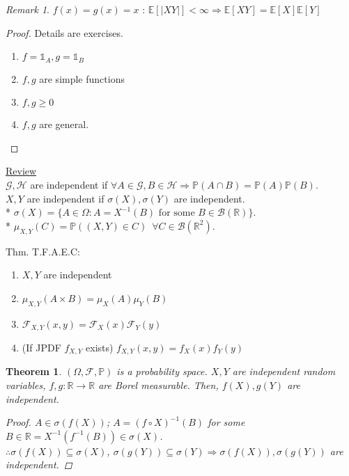 \documentclass[12pt]{report}
\newcommand{\R}{\mathbb{R}}
\renewcommand{\P}{\mathbb{P}}
\newcommand{\F}{\mathcal{F}}
\renewcommand{\1}{\mathbb{1}}
\renewcommand{\O}{\Omega}
\renewcommand{\r}{\rightarrow}
\renewcommand{\subset}{\subseteq}
\theoremstyle{break}
\newtheorem{thm}{Theorem}[section] %
\theoremstyle{newdef}
\theoremstyle{remark}
\newtheorem*{rem}{Remark} %
\begin{document}
\begin{rem}
$f(x) = g(x) = x$ : $\mathbb{E}[|XY|] < \infty \Rightarrow \mathbb{E}[XY] = \mathbb{E}[X]\mathbb{E}[Y]$
\end{rem}


\begin{proof}
Details are exercises.
\begin{enumerate}[label = (\arabic*)]
\item $f = \mathbb{1}_A, g = \mathbb{1}_B$
\item $f, g$ are simple functions
\item $f, g \geq 0$
\item $f, g$ are general.
\end{enumerate}
\end{proof}






\underline{Review}\\
$\mathcal{G, H}$ are independent if
$\forall A \in \mathcal{G}, B \in \mathcal{H} \Rightarrow \P(A \cap B) = \P(A)\P(B).$\\
$X, Y$ are independent if $\sigma(X), \sigma(Y)$ are independent.\\
* $\sigma(X) = \{A \in \Omega : A = X^{-1}(B) \text{ for some } B \in \mathcal{B}(\R)\}$.\\
* $\mu_{X,Y}(C) = \P((X,Y) \in C) \enspace \forall C \in \mathcal{B}(\R^2)$.

\vspace{5mm}

Thm. T.F.A.E.C:
\begin{enumerate}
\item $X,Y$ are independent
\item $\mu_{X,Y}(A\times B) = \mu_X(A)\mu_Y(B)$
\item $\F_{X,Y}(x,y) = \F_X(x)\F_Y(y)$
\item (If JPDF $f_{X,Y}$ exists) $f_{X,Y}(x,y) = f_X(x)f_Y(y)$
\end{enumerate}




\begin{thm}
$(\O,\F,\P)$ is a probability space. $X,Y$ are independent random variables, $f, g : \R \r \R$ are Borel measurable.
Then, $f(X), g(Y)$ are independent.

\begin{proof}
$A \in \sigma(f(X))$;
$A = (f\circ X)^{-1}(B)$ for some $B \in \mathcal{\R}
= X^{-1}(f^{-1}(B)) \in \sigma(X)$.\\
$\therefore \sigma(f(X)) \subset \sigma(X)$, $\sigma(g(Y)) \subset \sigma(Y)
\Rightarrow \sigma(f(X)), \sigma(g(Y))$ are independent.
\end{proof}
\end{thm}
\end{document}
